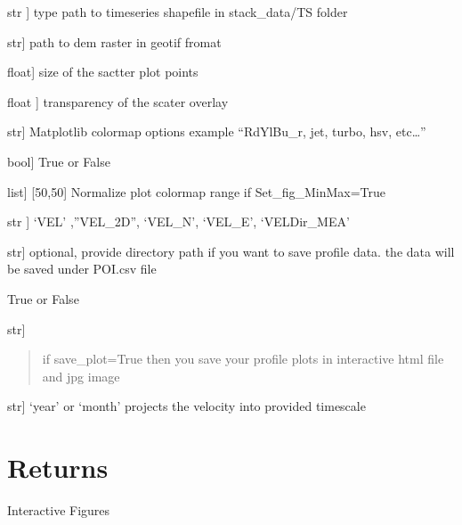 \documentclass[letterpaper,10pt]{sphinxmanual}
\begin{document}
\begin{fulllineitems}
\begin{description}
\sphinxlineitem{path\_to\_shapefile}{[}str {]}
\sphinxAtStartPar
type path to timeseries shapefile in stack\_data/TS folder

\sphinxlineitem{dem\_path}{[}str{]}
\sphinxAtStartPar
path to dem raster in geotif fromat

\sphinxlineitem{point\_size}{[}float{]}
\sphinxAtStartPar
size of the sactter plot points

\sphinxlineitem{opacity}{[}float {]}
\sphinxAtStartPar
transparency of the scater overlay

\sphinxlineitem{cmap}{[}str{]}
\sphinxAtStartPar
Matplotlib colormap options example “RdYlBu\_r, jet, turbo, hsv, etc…”

\sphinxlineitem{Set\_fig\_MinMax}{[}bool{]}
\sphinxAtStartPar
True or False

\sphinxlineitem{MinMaxRange}{[}list{]}
\sphinxAtStartPar
{[}\sphinxhyphen{}50,50{]}  Normalize plot colormap range if Set\_fig\_MinMax=True

\sphinxlineitem{color\_field}{[}str {]}
\sphinxAtStartPar
‘VEL’ ,”VEL\_2D”, ‘VEL\_N’, ‘VEL\_E’, ‘VELDir\_MEA’

\sphinxlineitem{path\_saveData\_points}{[}str{]}
\sphinxAtStartPar
optional, provide directory path if you want to save profile data.
the data will be saved under POI.csv file

\sphinxAtStartPar
True or False

\sphinxlineitem{Fig\_outputDir}{[}str{]}\begin{quote}

\sphinxAtStartPar
if save\_plot=True then
you save your profile plots in interactive html file and jpg image
\end{quote}
\begin{description}
\sphinxlineitem{VEL\_Scale}{[}str{]}
\sphinxAtStartPar
‘year’ or ‘month’ projects the velocity into provided time\sphinxhyphen{}scale

\end{description}

\end{description}


\section{Returns}
\label{\detokenize{generated/akhdefo_functions.akhdefo_ts_plot:returns}}
\sphinxAtStartPar
Interactive Figures

\end{fulllineitems}
\end{document}
